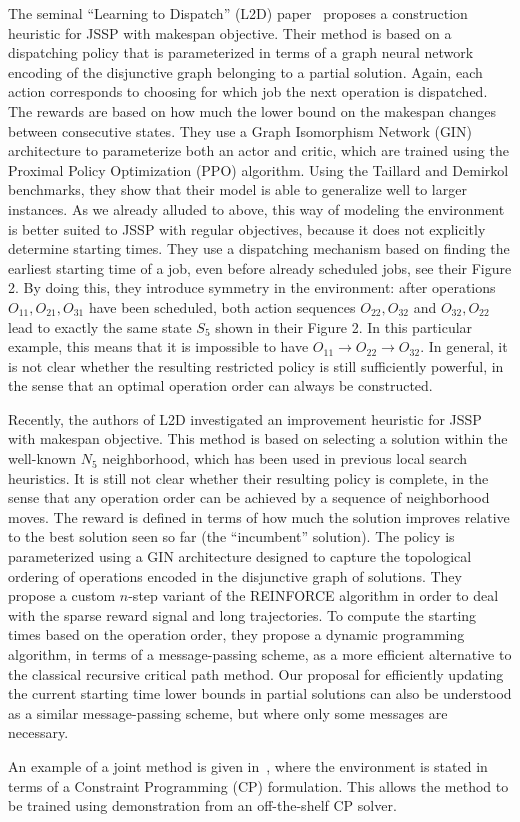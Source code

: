 \documentclass{article}
\theoremstyle{definition}
\theoremstyle{plain}
\begin{document}
The seminal ``Learning to Dispatch'' (L2D)
paper~\cite{zhangLearningDispatchJob2020} proposes a construction heuristic for
JSSP with makespan objective. Their method is based on a dispatching policy that
is parameterized in terms of a graph neural network encoding of the disjunctive
graph belonging to a partial solution. Again, each action corresponds to
choosing for which job the next operation is dispatched. The rewards are based
on how much the lower bound on the makespan changes between consecutive states.
They use a Graph Isomorphism Network (GIN) architecture to parameterize both an
actor and critic, which are trained using the Proximal Policy Optimization (PPO)
algorithm. Using the Taillard and Demirkol benchmarks, they show that their
model is able to generalize well to larger instances.
As we already alluded to above, this way of modeling the environment is better
suited to JSSP with regular objectives, because it does not explicitly determine
starting times.
%
They use a dispatching mechanism based on finding the earliest starting time of
a job, even before already scheduled jobs, see their Figure 2. By doing this,
they introduce symmetry in the environment: after operations
$O_{11}, O_{21}, O_{31}$ have been scheduled, both action sequences
$O_{22}, O_{32}$ and $O_{32}, O_{22}$ lead to exactly the same state $S_5$ shown
in their Figure 2. In this particular example, this means that it is impossible
to have $O_{11} \rightarrow O_{22} \rightarrow O_{32}$. In general, it is not
clear whether the resulting restricted policy is still sufficiently powerful, in
the sense that an optimal operation order can always be constructed.


Recently, the authors of L2D investigated an improvement heuristic for
JSSP~\cite{zhangDeepReinforcementLearning2024} with makespan objective.
%
This method is based on selecting a solution within the well-known $N_5$
neighborhood, which has been used in previous local search heuristics.
%
It is still not clear whether their resulting policy is complete, in the sense
that any operation order can be achieved by a sequence of neighborhood moves.
%
The reward is defined in terms of how much the solution improves relative to the
best solution seen so far (the ``incumbent'' solution). The policy is
parameterized using a GIN architecture designed to capture the topological
ordering of operations encoded in the disjunctive graph of solutions. They
propose a custom $n$-step variant of the REINFORCE algorithm in order to deal
with the sparse reward signal and long trajectories.
%
To compute the starting times based on the operation order, they propose a
dynamic programming algorithm, in terms of a message-passing scheme, as a more
efficient alternative to the classical recursive critical path method.
%
Our proposal for efficiently updating the current starting time lower bounds in
partial solutions can also be understood as a similar message-passing scheme,
but where only some messages are necessary.

An example of a joint method is given in~\cite{tasselEndEndReinforcementLearning2023}, where the environment is stated in
terms of a Constraint Programming (CP) formulation. This allows the method to be
trained using demonstration from an off-the-shelf CP solver.
\end{document}
